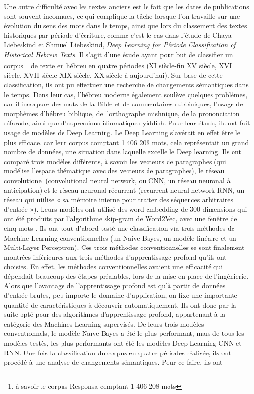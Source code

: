 \documentclass{article}
\begin{document}
\paragraph{}
Une autre difficulté avec les textes anciens est le fait que les dates de publications sont souvent inconnues, ce qui complique la tâche lorsque l’on travaille sur une évolution du sens des mots dans le temps, ainsi que lors du classement des textes historiques par période d’écriture, comme c’est le cas dans l’étude de Chaya Liebeskind et Shmuel Liebeskind, \textit{Deep Learning for Période Classification of Historical Hebrew Texts}. Il s’agit d’une étude ayant pour but de classifier un corpus \footnote{à savoir le corpus Responsa comptant 1 406 208 mots} de texte en hébreu en quatre périodes (XI siècle-fin XV siècle, XVI siècle, XVII siècle-XIX siècle, XX siècle à aujourd’hui). Sur base de cette classification, ils ont pu effectuer une recherche de changements sémantiques dans le temps. Dans leur cas, l’hébreu moderne également soulève quelques problèmes, car il incorpore des mots de la Bible et de commentaires rabbiniques, l’usage de morphèmes d’hébreu biblique, de l’orthographe mishnique, de la prononciation séfarade, ainsi que d’expressions idiomatiques yiddish. Pour leur étude, ils ont fait usage de modèles de Deep Learning. Le Deep Learning s’avérait en effet être le plus efficace, car leur corpus comptant 1 406 208 mots, cela représentait un grand nombre de données, une situation dans laquelle excelle le Deep learning. Ils ont comparé trois modèles différents, à savoir les vecteurs de paragraphes (qui modélise l’espace thématique avec des vecteurs de paragraphes), le réseau convolutionel (convolutional neural network, ou CNN, un réseau neuronal à anticipation) et le réseau neuronal récurrent (recurrent neural network RNN, un réseau qui utilise « sa mémoire interne pour traiter des séquences arbitraires d’entrée »\cite{liebeskind2020deep}). Leurs modèles ont utilisé des word-embedding de 300 dimensions qui ont été produits par l’algorithme skip-gram de Word2Vec, avec une fenêtre de cinq mots . Ils ont tout d’abord testé une classification via trois méthodes de Machine Learning conventionnelles (un Naive Bayes, un modèle linéaire et un Multi-Layer Perceptron). Ces trois méthodes conventionnelles se sont finalement montrées inférieures aux trois méthodes d’apprentissage profond qu’ils ont choisies. En effet, les méthodes conventionnelles avaient une efficacité qui dépendait beaucoup des étapes préalables, lors de la mise en place de l’ingénierie. Alors que l’avantage de l’apprentissage profond est qu’à partir de données d’entrée brutes, peu importe le domaine d’application, on fixe une importante quantité de caractéristiques à découvrir automatiquement. Ils ont donc par la suite opté pour des algorithmes d’apprentissage profond, appartenant à la catégorie des Machines Learning supervisés. De leurs trois modèles conventionnels, le modèle Naive Bayes a été le plus performant, mais de tous les modèles testés, les plus performants ont été les modèles Deep Learning CNN et RNN. Une fois la classification du corpus en quatre périodes réalisée, ils ont procédé à une analyse de changements sémantiques. Pour ce faire, ils ont 
\end{document}
